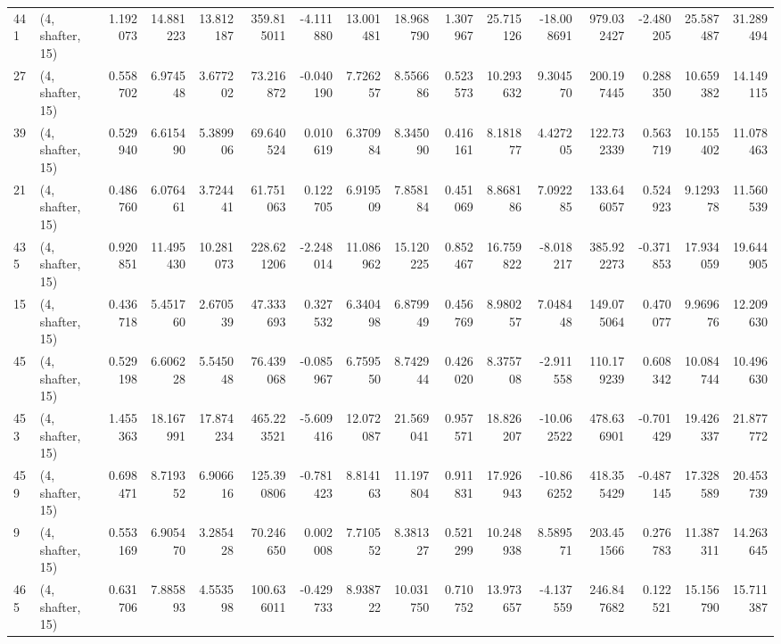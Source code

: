 \begin{tabular}{llrrrrrrrrrrrrrr}
441 &  (4, shafter, 15) &   1.192073 &  14.881223 &  13.812187 &   359.815011 &  -4.111880 &  13.001481 &  18.968790 &  1.307967 &  25.715126 & -18.008691 &   979.032427 & -2.480205 &  25.587487 &  31.289494 \\
27  &  (4, shafter, 15) &   0.558702 &   6.974548 &   3.677202 &    73.216872 &  -0.040190 &   7.726257 &   8.556686 &  0.523573 &  10.293632 &   9.304570 &   200.197445 &  0.288350 &  10.659382 &  14.149115 \\
39  &  (4, shafter, 15) &   0.529940 &   6.615490 &   5.389906 &    69.640524 &   0.010619 &   6.370984 &   8.345090 &  0.416161 &   8.181877 &   4.427205 &   122.732339 &  0.563719 &  10.155402 &  11.078463 \\
21  &  (4, shafter, 15) &   0.486760 &   6.076461 &   3.724441 &    61.751063 &   0.122705 &   6.919509 &   7.858184 &  0.451069 &   8.868186 &   7.092285 &   133.646057 &  0.524923 &   9.129378 &  11.560539 \\
435 &  (4, shafter, 15) &   0.920851 &  11.495430 &  10.281073 &   228.621206 &  -2.248014 &  11.086962 &  15.120225 &  0.852467 &  16.759822 &  -8.018217 &   385.922273 & -0.371853 &  17.934059 &  19.644905 \\
15  &  (4, shafter, 15) &   0.436718 &   5.451760 &   2.670539 &    47.333693 &   0.327532 &   6.340498 &   6.879949 &  0.456769 &   8.980257 &   7.048448 &   149.075064 &  0.470077 &   9.969676 &  12.209630 \\
45  &  (4, shafter, 15) &   0.529198 &   6.606228 &   5.545048 &    76.439068 &  -0.085967 &   6.759550 &   8.742944 &  0.426020 &   8.375708 &  -2.911558 &   110.179239 &  0.608342 &  10.084744 &  10.496630 \\
453 &  (4, shafter, 15) &   1.455363 &  18.167991 &  17.874234 &   465.223521 &  -5.609416 &  12.072087 &  21.569041 &  0.957571 &  18.826207 & -10.062522 &   478.636901 & -0.701429 &  19.426337 &  21.877772 \\
459 &  (4, shafter, 15) &   0.698471 &   8.719352 &   6.906616 &   125.390806 &  -0.781423 &   8.814163 &  11.197804 &  0.911831 &  17.926943 & -10.866252 &   418.355429 & -0.487145 &  17.328589 &  20.453739 \\
9   &  (4, shafter, 15) &   0.553169 &   6.905470 &   3.285428 &    70.246650 &   0.002008 &   7.710552 &   8.381327 &  0.521299 &  10.248938 &   8.589571 &   203.451566 &  0.276783 &  11.387311 &  14.263645 \\
465 &  (4, shafter, 15) &   0.631706 &   7.885893 &   4.553598 &   100.636011 &  -0.429733 &   8.938722 &  10.031750 &  0.710752 &  13.973657 &  -4.137559 &   246.847682 &  0.122521 &  15.156790 &  15.711387 \\

\end{tabular}
